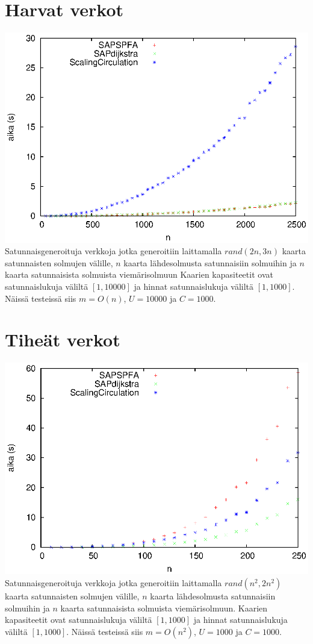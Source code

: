 \documentclass[a4paper, 11pt]{article}
\begin{document}
\section*{Harvat verkot}
\includegraphics[scale=1.4]{application/random/sparse.eps}\\
Satunnaisgeneroituja verkkoja jotka generoitiin laittamalla $rand(2n, 3n)$ kaarta satunnaisten solmujen
välille, $n$ kaarta lähdesolmusta satunnaisiin solmuihin ja $n$ kaarta satunnaisista solmuista viemärisolmuun
 Kaarien kapasiteetit ovat satunnaislukuja väliltä $[1, 10000]$ ja hinnat satunnaislukuja
väliltä $[1, 1000]$. Näissä testeissä siis $m = O(n)$, $U = 10000$ ja $C = 1000$.

\section*{Tiheät verkot}
\includegraphics[scale=1.4]{application/random/dense.eps}\\
Satunnaisgeneroituja verkkoja jotka generoitiin laittamalla $rand(n^2, 2n^2)$ kaarta satunnaisten solmujen
välille, $n$ kaarta lähdesolmusta satunnaisiin solmuihin ja $n$ kaarta satunnaisista solmuista viemärisolmuun.
Kaarien kapasiteetit ovat satunnaislukuja väliltä $[1, 1000]$ ja hinnat satunnaislukuja väliltä
$[1, 1000]$. Näissä testeissä siis $m = O(n^2)$, $U = 1000$ ja $C = 1000$.
\end{document}
